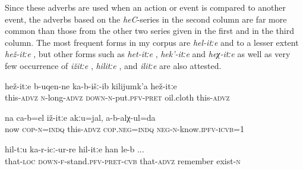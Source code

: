 Since these adverbs are used when an action or event is compared to another event, the adverbs based on the \textit{heC}-series in the second column are far more common than those from the other two series given in the first and in the third column. The most frequent forms in my corpus are \textit{hel-itːe}  and to a lesser extent \textit{hež-itːe}  , but other forms such as \textit{het-itːe} , \textit{hek'-itːe}  and \textit{heχ-itːe}  as well as very few occurrence of \textit{ižitːe} , \textit{hilitːe} , and \textit{ilitːe} are also attested.
%
\begin{exe}
	\ex	\label{ex:Like this alongside we put the oil cloth}
	\gll	hež-itːe	b-uqen-ne	ka-b-išː-ib	kilijumk'a	hež-itːe  \\
		this-\textsc{advz}	\textsc{n}-long-\textsc{advz}	\textsc{down-n}-put.\textsc{pfv}-\textsc{pret}	oil.cloth	this-\textsc{advz}\\
	\glt	{}

	\ex	\label{ex:‎‎I do not know whether it was like this or not}
	\gll	na	ca-b=el	iž-itːe	akːu=jal,	a-b-alχ-ul=da  \\
		now	\textsc{cop}-\textsc{n}=\textsc{indq}	this-\textsc{advz}	\textsc{cop.neg}=\textsc{indq}	\textsc{neg}-\textsc{n}-know.\textsc{ipfv}-\textsc{icvb}=1\\
	\glt	{}

	\ex	\label{ex:‎‎I remember like I was standing there like that}
	\gll	hil-tːu	ka-r-icː-ur-re	hil-itːe	han	le-b  ...\\
		that-\textsc{loc}	\textsc{down-f}-stand.\textsc{pfv}-\textsc{pret}-\textsc{cvb}	that-\textsc{advz}	remember	exist-\textsc{n}\\
	\glt	{}
\end{exe}

